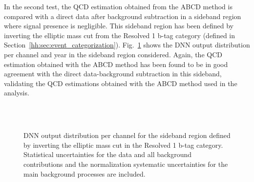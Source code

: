 \documentclass[../main.tex]{subfiles}
\begin{document}
In the second test, the QCD estimation obtained from the ABCD method is compared with a direct data after background subtraction in a sideband region where signal presence is negligible. This sideband region has been defined by inverting the elliptic mass cut from the Resolved 1 b-tag category (defined in Section~\ref{hh:sec:event_categorization}). Fig.~\ref{hh:fig:qcd_test2_dnn} shows the DNN output distribution per channel and year in the sideband region considered. Again, the QCD estimation obtained with the ABCD method has been found to be in good agreement with the direct data-background subtraction in this sideband, validating the QCD estimations obtained with the ABCD method used in the analysis.

\begin{figure}
\centering
{}
\\
\\
    \caption[QCD estimation - Second validity test]{DNN output distribution per channel for the sideband region defined by inverting the elliptic mass cut in the Resolved 1 b-tag category.  Statistical uncertainties for the data and all background contributions and the normalization systematic uncertainties for the main background processes are included.}
    \label{hh:fig:qcd_test2_dnn}
\end{figure}
\end{document}

